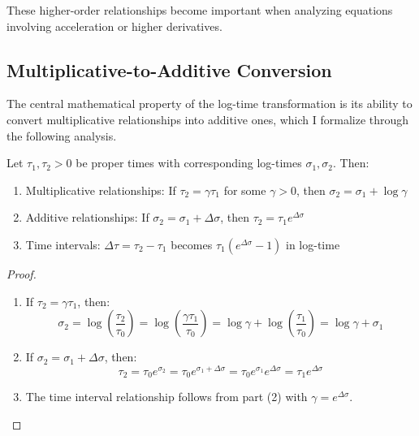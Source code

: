 These higher-order relationships become important when analyzing equations involving acceleration or higher derivatives.

\subsection{Multiplicative-to-Additive Conversion}
\label{subsec:multiplicative_additive}

The central mathematical property of the log-time transformation is its ability to convert multiplicative relationships into additive ones, which I formalize through the following analysis.

\begin{theorem}
\label{thm:mult_add_conversion}
Let $\tau_1, \tau_2 > 0$ be proper times with corresponding log-times $\sigma_1, \sigma_2$. Then:
\begin{enumerate}
\item Multiplicative relationships: If $\tau_2 = \gamma \tau_1$ for some $\gamma > 0$, then $\sigma_2 = \sigma_1 + \log \gamma$
\item Additive relationships: If $\sigma_2 = \sigma_1 + \Delta\sigma$, then $\tau_2 = \tau_1 e^{\Delta\sigma}$
\item Time intervals: $\Delta\tau = \tau_2 - \tau_1$ becomes $\tau_1(e^{\Delta\sigma} - 1)$ in log-time
\end{enumerate}
\end{theorem}

\begin{proof}
\begin{enumerate}
\item If $\tau_2 = \gamma \tau_1$, then:
\begin{equation}
\sigma_2 = \log\left(\frac{\tau_2}{\tau_0}\right) = \log\left(\frac{\gamma \tau_1}{\tau_0}\right) = \log\gamma + \log\left(\frac{\tau_1}{\tau_0}\right) = \log\gamma + \sigma_1
\end{equation}

\item If $\sigma_2 = \sigma_1 + \Delta\sigma$, then:
\begin{equation}
\tau_2 = \tau_0 e^{\sigma_2} = \tau_0 e^{\sigma_1 + \Delta\sigma} = \tau_0 e^{\sigma_1} e^{\Delta\sigma} = \tau_1 e^{\Delta\sigma}
\end{equation}

\item The time interval relationship follows from part (2) with $\gamma = e^{\Delta\sigma}$.
\end{enumerate}
\end{proof}


